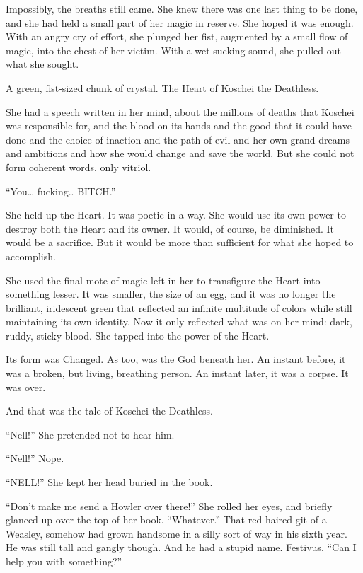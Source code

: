 Impossibly, the breaths still came. She knew there was one last thing to be done, and she had held a small part of her magic in reserve. She hoped it was enough. With an angry cry of effort, she plunged her fist, augmented by a small flow of magic, into the chest of her victim. With a wet sucking sound, she pulled out what she sought.

A green, fist-sized chunk of crystal. The Heart of Koschei the Deathless.

She had a speech written in her mind, about the millions of deaths that Koschei was responsible for, and the blood on its hands and the good that it could have done and the choice of inaction and the path of evil and her own grand dreams and ambitions and how she would change and save the world. But she could not form coherent words, only vitriol.

“You… fucking.. BITCH.”

She held up the Heart. It was poetic in a way. She would use its own power to destroy both the Heart and its owner. It would, of course, be diminished. It would be a sacrifice. But it would be more than sufficient for what she hoped to accomplish.

She used the final mote of magic left in her to transfigure the Heart into something lesser. It was smaller, the size of an egg, and it was no longer the brilliant, iridescent green that reflected an infinite multitude of colors while still maintaining its own identity. Now it only reflected what was on her mind: dark, ruddy, sticky blood. She tapped into the power of the Heart.

Its form was Changed. As too, was the God beneath her. An instant before, it was a broken, but living, breathing person. An instant later, it was a corpse. It was over.

And that was the tale of Koschei the Deathless.
\simpleline

“Nell!” She pretended not to hear him.

“Nell!” Nope.

“NELL!” She kept her head buried in the book.

“Don’t make me send a Howler over there!” She rolled her eyes, and briefly glanced up over the top of her book. “Whatever.” That red-haired git of a Weasley, somehow had grown handsome in a silly sort of way in his sixth year. He was still tall and gangly though. And he had a stupid name. Festivus. “Can I help you with something?”

